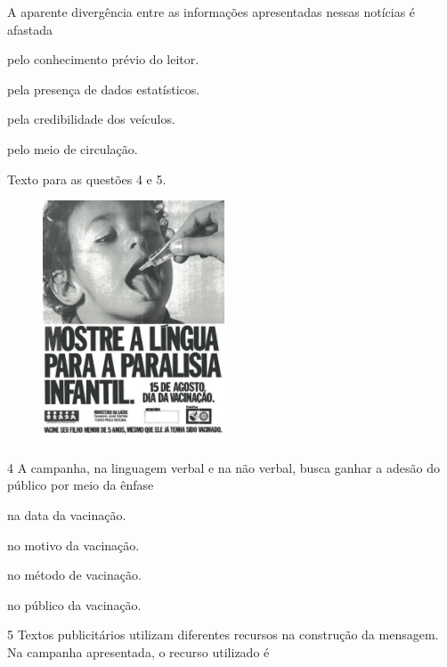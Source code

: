 A aparente divergência entre as informações apresentadas nessas notícias
é afastada

\begin{escolha}
\item pelo conhecimento prévio do leitor.

\item pela presença de dados estatísticos.

\item pela credibilidade dos veículos.

\item pelo meio de circulação.
\end{escolha}

Texto para as questões 4 e 5.

\begin{figure}[H]
\centering
\includegraphics[width=2.12879in,height=2.83333in]{./imgSAEB_8_POR/media/image39.jpeg}
\end{figure}


\num{4} A campanha, na linguagem verbal e na não verbal, busca ganhar a adesão do
público por meio da ênfase

\begin{escolha}
\item na data da vacinação.

\item no motivo da vacinação.

\item no método de vacinação.

\item no público da vacinação.
\end{escolha}


\num{5} Textos publicitários utilizam diferentes recursos na construção da
mensagem. Na campanha apresentada, o recurso utilizado é

